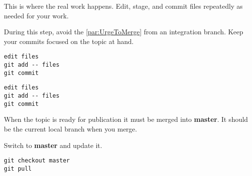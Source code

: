 This is where the real work happens. Edit, stage, and commit files
repeatedly as needed for your work.

During this step, avoid the \ref{par:UrgeToMerge} from an integration branch.
Keep your commits focused on the topic at hand.

\begin{verbatim}
edit files
git add -- files
git commit
\end{verbatim}

\begin{figure}
\centering
{}
\label{fig:CommitChanges}
\end{figure}

\begin{verbatim}
edit files
git add -- files
git commit
\end{verbatim}

\begin{figure}
\centering
{}
\label{fig:CommitLastChanges}
\end{figure}

When the topic is ready for publication it must be merged into \textbf{master}.
It should be the current local branch when you merge.

Switch to \textbf{master} and update it.

\begin{verbatim}
git checkout master
git pull
\end{verbatim}

